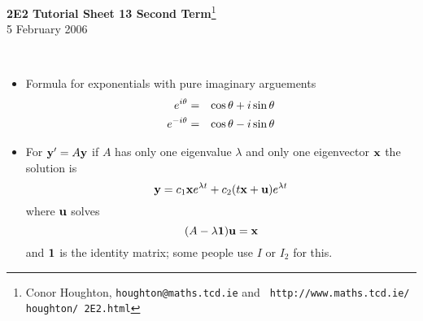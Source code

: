 \documentclass[12pt]{article}
\begin{document}
\begin{center}
{\bf 2E2 Tutorial Sheet 13 Second Term}\footnote{Conor
Houghton, {\tt houghton@maths.tcd.ie} and {\tt
http://www.maths.tcd.ie/ houghton/ 2E2.html}}
\\[1cm]
5 February 2006
\end{center}
{
\\
\begin{itemize}
\item Formula for exponentials with pure imaginary arguements
\begin{eqnarray}
e^{i\theta}&=&\cos{\theta}+i\sin{\theta}\cr
e^{-i\theta}&=&\cos{\theta}-i\sin{\theta}
\end{eqnarray}
\item For ${\bf y}'=A{\bf y}$
if $A$ has only one eigenvalue $\lambda$ and only one eigenvector ${\bf x}$ the solution is
\begin{equation}
{\bf y}=c_1{\bf x}e^{\lambda t}+c_2(t{\bf x}+{\bf u})e^{\lambda t}
\end{equation}
where ${\bf u}$ solves
\begin{equation}
(A-\lambda {\bf 1}){\bf u}={\bf x}
\end{equation}
and ${\bf 1}$ is the identity matrix; some people use $I$ or $I_2$ for this.
\end{itemize}
\vskip 1cm
}
\end{document}

